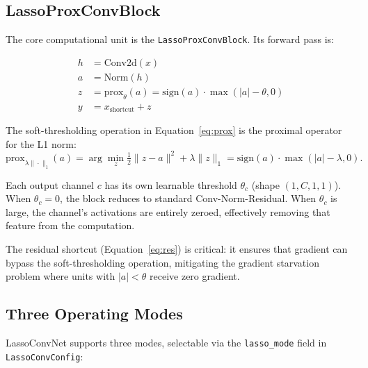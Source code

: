 \documentclass{article}
\begin{document}
\subsection{LassoProxConvBlock}

The core computational unit is the \texttt{LassoProxConvBlock}. Its forward pass
is:

\begin{align}
    h &= \text{Conv2d}(x)                                 \label{eq:conv} \\
    a &= \text{Norm}(h)                                   \label{eq:norm} \\
    z &= \text{prox}_{\theta}(a) = \text{sign}(a) \cdot \max(|a| - \theta, 0)
                                                          \label{eq:prox} \\
    y &= x_{\text{shortcut}} + z                          \label{eq:res}
\end{align}

The soft-thresholding operation in Equation~\eqref{eq:prox} is the proximal
operator for the L1 norm:
\begin{equation}
    \text{prox}_{\lambda \|\cdot\|_1}(a) = \arg\min_{z}
    \tfrac{1}{2}\|z - a\|^2 + \lambda\|z\|_1
    = \text{sign}(a) \cdot \max(|a| - \lambda, 0).
\end{equation}

Each output channel $c$ has its own learnable threshold $\theta_c$ (shape
$(1, C, 1, 1)$). When $\theta_c = 0$, the block reduces to standard
Conv-Norm-Residual. When $\theta_c$ is large, the channel's activations
are entirely zeroed, effectively removing that feature from the computation.

The residual shortcut (Equation~\ref{eq:res}) is critical: it ensures that
gradient can bypass the soft-thresholding operation, mitigating the gradient
starvation problem where units with $|a| < \theta$ receive zero gradient.

\subsection{Three Operating Modes}

LassoConvNet supports three modes, selectable via the \texttt{lasso\_mode} field
in \texttt{LassoConvConfig}:
\end{document}
